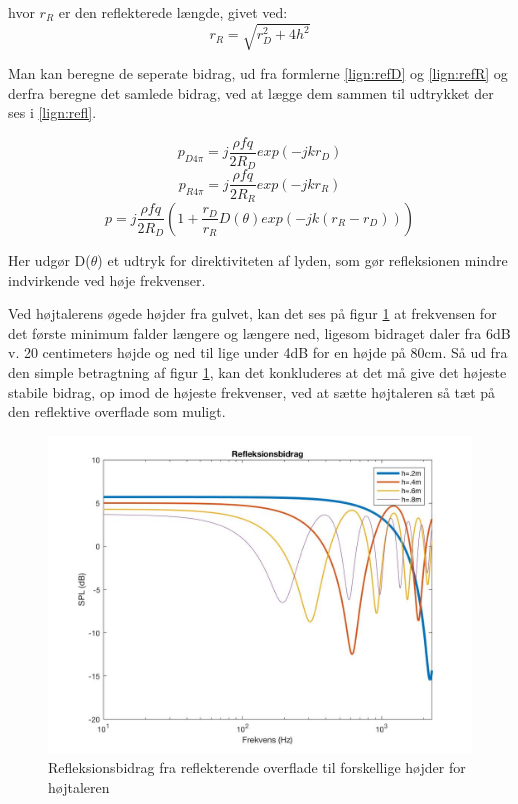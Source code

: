 hvor $r_R$ er den reflekterede længde, givet ved:
\begin{equation}
r_R=\sqrt{r_D^2+4h^2}
\end{equation}

Man kan beregne de seperate bidrag, ud fra formlerne \ref{lign:refD} og \ref{lign:refR} og derfra beregne det samlede bidrag, ved at lægge dem sammen til udtrykket der ses i \ref{lign:refl}. 

\begin{equation}\label{lign:refD}
	p_{D4\pi}=j\frac{\rho fq}{2R_D}exp(-jkr_D)
\end{equation}
\begin{equation}\label{lign:refR}
p_{R4\pi}=j\frac{\rho fq}{2R_R}exp(-jkr_R)
\end{equation}
\begin{equation}\label{lign:refl}
p=j\frac{\rho fq}{2R_D}(1+\frac{r_D}{r_R}D(\theta)exp(-jk(r_R-r_D)))
\end{equation}

Her udgør D($\theta$) et udtryk for direktiviteten af lyden, som gør refleksionen mindre indvirkende ved høje frekvenser. 

Ved højtalerens øgede højder fra gulvet, kan det ses på figur \ref{fig:refleksionsbidrag} at frekvensen for det første minimum falder længere og længere ned, ligesom bidraget daler fra 6dB v. 20 centimeters højde og ned til lige under 4dB for en højde på 80cm. 
Så ud fra den simple betragtning af figur \ref{fig:refleksionsbidrag}, kan det konkluderes at det må give det højeste stabile bidrag, op imod de højeste frekvenser, ved at sætte højtaleren så tæt på den reflektive overflade som muligt.

\begin{figure}[h!]
	\centering
	\includegraphics[width=.8\textwidth]{Pics/refleksionsbidrag}
	\caption{Refleksionsbidrag fra reflekterende overflade til forskellige højder for højtaleren } 
	\label{fig:refleksionsbidrag}
\end{figure}

